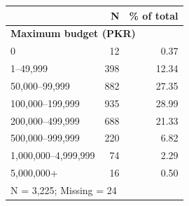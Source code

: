 \begin{tabular}{lrr}


\toprule


 & N & \% of total \\


\midrule


\multicolumn{3}{l}{\textbf{Maximum budget (PKR)}}\\ 


\midrule
0           &          12&        0.37\\
1–49,999    &         398&       12.34\\
50,000–99,999&         882&       27.35\\
100,000–199,999&         935&       28.99\\
200,000–499,999&         688&       21.33\\
500,000–999,999&         220&        6.82\\
1,000,000–4,999,999&          74&        2.29\\
5,000,000+  &          16&        0.50\\
\midrule


\multicolumn{3}{l}{\footnotesize N =        3,225; Missing =           24}\\


\bottomrule


\end{tabular}
